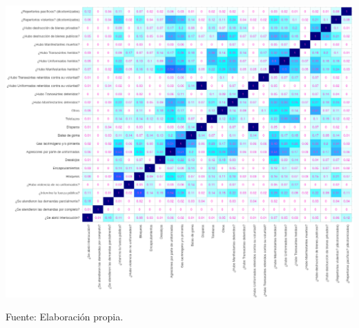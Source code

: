 \documentclass[letterpaper, 11pt]{book}
\theoremstyle{definition}
\theoremstyle{remark}
\begin{document}
\hspace{-1em}\begin{minipage}{\linewidth}
\centering
{} \label{3.24_simRespuestas}
\hspace{-2em}\includegraphics[scale=0.45]{img/3.24_simRespuestas.png}
\par
\small Fuente: Elaboración propia.
\end{minipage}\bigskip
\end{document}
